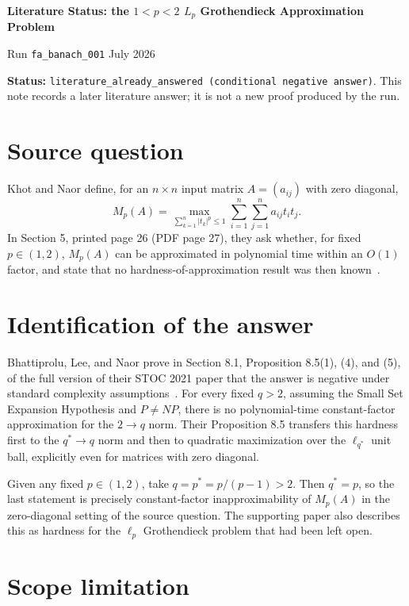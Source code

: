 \documentclass[10pt]{article}
\begin{document}
\begin{center}
  {\Large\bfseries Literature Status: the $1<p<2$ $L_p$ Grothendieck
  Approximation Problem\par}
  \vspace{0.5em}
  {Run \texttt{fa\_banach\_001}  July 2026}
\end{center}
\vspace{0.5em}

\textbf{Status:} \texttt{literature\_already\_answered (conditional negative answer)}.
This note records a later literature answer; it is not a new proof produced by
the run.

\section*{Source question}

Khot and Naor define, for an $n\times n$ input matrix $A=(a_{ij})$ with zero
diagonal,
\[
  M_p(A)=\max_{\sum_{k=1}^n |t_k|^p\leq 1}
  \sum_{i=1}^n\sum_{j=1}^n a_{ij}t_it_j.
\]
In Section 5, printed page 26 (PDF page 27), they ask whether, for fixed
$p\in(1,2)$, $M_p(A)$ can be approximated in polynomial time within an
$O(1)$ factor, and state that no hardness-of-approximation result was then
known~\cite{KN}.

\section*{Identification of the answer}

Bhattiprolu, Lee, and Naor prove in Section 8.1, Proposition 8.5(1), (4), and
(5), of the full version of their STOC 2021 paper that the answer is negative
under standard complexity assumptions~\cite{BLN}.  For every fixed $q>2$,
assuming the Small Set Expansion Hypothesis and $P\neq NP$, there is no
polynomial-time constant-factor approximation for the $2\to q$ norm.  Their
Proposition 8.5 transfers this hardness first to the $q^*\to q$ norm and then
to quadratic maximization over the $\ell_{q^*}$ unit ball, explicitly even for
matrices with zero diagonal.

Given any fixed $p\in(1,2)$, take $q=p^*=p/(p-1)>2$.  Then $q^*=p$, so the
last statement is precisely constant-factor inapproximability of $M_p(A)$ in
the zero-diagonal setting of the source question.  The supporting paper also
describes this as hardness for the $\ell_p$ Grothendieck problem that had been
left open.

\section*{Scope limitation}
\end{document}

